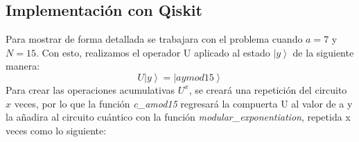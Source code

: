 \subsection{Implementación con Qiskit}
Para mostrar de forma detallada se trabajara con el problema cuando $a=7$ y $N=15$. Con esto, realizamos el operador U aplicado al estado $\left|y \right\rangle$ de la siguiente manera:
\begin{equation}
    U\left| y \right\rangle = \left|aymod15 \right\rangle 
    \label{eq:ua15}
\end{equation}
Para crear las operaciones acumulativas $U^x$, se creará una repetición del circuito $x$ veces, por lo que la función \textcolor{def}{\textit{c\_amod15}}
 regresará la compuerta U al valor de a y la añadira al circuito cuántico con la función \textcolor{def}{\textit{modular\_exponentiation}}, repetida x veces como lo siguiente:
